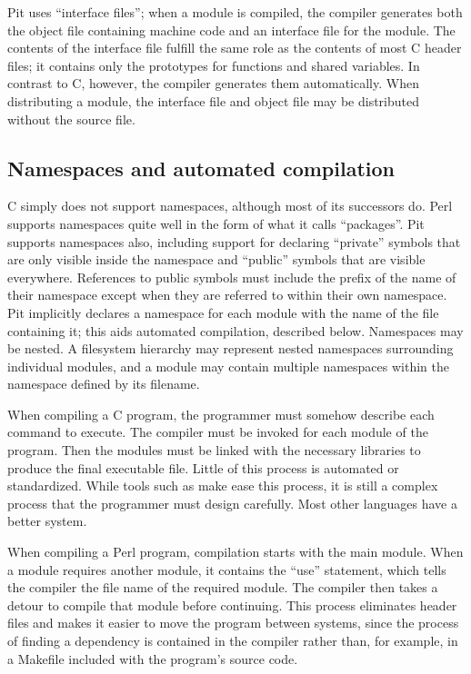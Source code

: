 Pit uses ``interface files''; when a module is compiled, the compiler generates both the object file containing machine
code and an interface file for the module.  The contents of the interface file fulfill the same role as the contents of
most C header files; it contains only the prototypes for functions and shared variables.  In contrast to C, however,
the compiler generates them automatically.  When distributing a module, the interface file and object file may be
distributed without the source file.

\subsection{Namespaces and automated compilation}

C simply does not support namespaces, although most of its successors do.  Perl supports namespaces quite well in the
form of what it calls ``packages''.  Pit supports namespaces also, including support for declaring ``private'' symbols
that are only visible inside the namespace and ``public'' symbols that are visible everywhere.  References to public
symbols must include the prefix of the name of their namespace except when they are referred to within their own
namespace.  Pit implicitly declares a namespace for each module with the name of the file containing it; this aids
automated compilation, described below.  Namespaces may be nested.  A filesystem hierarchy may represent
nested namespaces surrounding individual modules, and a module may contain multiple namespaces within the namespace
defined by its filename.

When compiling a C program, the programmer must somehow describe each command to execute.  The compiler must be invoked
for each module of the program.  Then the modules must be linked with the necessary libraries to produce the final
executable file.  Little of this process is automated or standardized.  While tools such as make ease this process, it is still
a complex process that the programmer must design carefully.  Most other languages have a better system.

When compiling a Perl program, compilation starts with the main module.  When a module requires another module, it
contains the ``use'' statement, which tells the compiler the file name of the required module.  The compiler then takes
a detour to compile that module before continuing.  This process eliminates header files and makes it easier to move
the program between systems, since the process of finding a dependency is contained in the compiler rather than, for
example, in a Makefile included with the program's source code.

